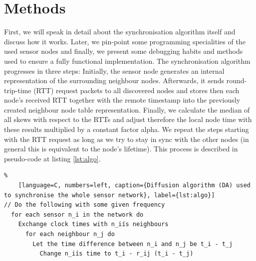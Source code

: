 \documentclass{llncs}
\begin{document}
\section{Methods}

First, we will speak in detail about the synchronisation algorithm itself and discuss how it works. Later, we pin-point some programming specialities of the used sensor nodes and finally, we present some debugging habits and methods used to ensure a fully functional implementation.
\bigbreak
\noindent The synchronisation algorithm progresses in three steps: Initially, the sensor node generates an internal representation of the surrounding neighbour nodes. Afterwards, it sends round-trip-time (RTT) request packets to all discovered nodes and stores then each node's received RTT together with the remote timestamp into the previously created neighbour node table representation. Finally, we calculate the median of all skews with respect to the RTTs and adjust therefore the local node time with these results multiplied by a constant factor alpha. We repeat the steps starting with the RTT request as long as we try to stay in sync with the other nodes (in general this is equivalent to the node's lifetime). This process is described in pseudo-code at listing  \ref{lst:algo}.

\begin{lstlisting}%
	[language=C, numbers=left, caption={Diffusion algorithm (DA) used to synchronise the whole sensor network}, label={lst:algo}]
// Do the following with some given frequency
  for each sensor n_i in the network do
    Exchange clock times with n_iís neighbours
      for each neighbour n_j do
        Let the time difference between n_i and n_j be t_i - t_j
          Change n_iís time to t_i - r_ij (t_i - t_j)
\end{lstlisting}
\end{document}

